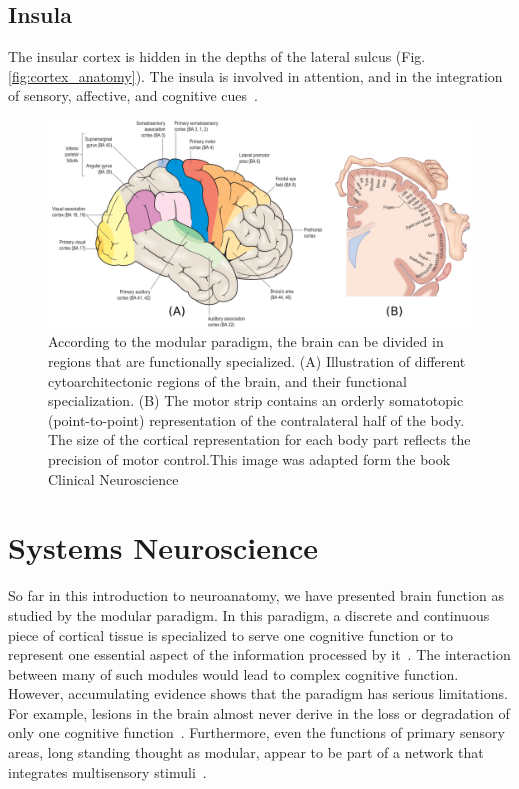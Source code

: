 \subsection{Insula}
The insular cortex is hidden in the depths of the lateral sulcus (Fig.
\ref{fig:cortex_anatomy}). The insula is involved in attention, and in the
integration of sensory, affective, and cognitive cues~\cite{Bressler2010, Johns}.

\begin{figure}[t]
    \includegraphics[width=\textwidth]{2.neuroanatomy/img/function.png}
    \caption{According to the modular paradigm, the brain can be divided in
             regions that are functionally specialized. (A) Illustration of
             different cytoarchitectonic regions of the brain, and their
             functional specialization. (B) The motor strip contains an
             orderly somatotopic (point-to-point) representation of the
             contralateral half of the body. The size of the cortical
             representation for each body part reflects the precision of
             motor control.This image
             was adapted form the book Clinical Neuroscience\cite{Johns}}
    \label{fig:brain_function}
\end{figure}


\section{Systems Neuroscience}
So far in this introduction to neuroanatomy, we have presented brain function
as studied by the modular paradigm.
In this paradigm, a discrete and continuous piece of cortical tissue is specialized
to serve one cognitive function or to represent one essential aspect of the
information processed by it~\cite{Fuster2000}. The interaction between many
of such modules would lead to complex cognitive function. However, accumulating
evidence shows that the paradigm has serious limitations. For example, lesions
in the brain almost never derive in the loss or degradation of only one cognitive
function~\cite{Fuster2000}. Furthermore, even the functions of primary sensory
areas, long standing thought as modular, appear to be part of a network that
integrates multisensory stimuli~\cite{Ghazanfar2006}.

